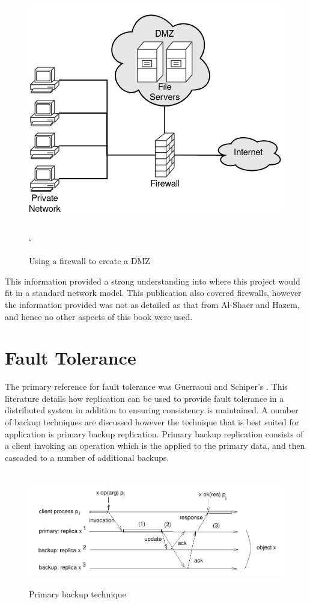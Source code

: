 \documentclass[a4paper, 11pt]{report}
\begin{document}
\begin{figure}[H]
\centering
\includegraphics[height=10cm,keepaspectratio]{DMZ}
\caption{Using a firewall to create a \acrshort{DMZ}} `
\label{fig:dmz}
\end{figure}

This information provided a strong understanding into where this project would fit in a standard network model. This publication also covered firewalls, however the information provided was not as detailed as that from Al-Shaer and Hazem, and hence no other aspects of this book were used.

\section{Fault Tolerance}
The primary reference for fault tolerance was Guerraoui and Schiper's \cite{faulttol}. This literature details how replication can be used to provide fault tolerance in a distributed system in addition to ensuring consistency is maintained.  A number of backup techniques are discussed however the technique that is best suited for application is primary backup replication. Primary backup replication consists of a client invoking an operation which is the applied to the primary data, and then cascaded to a number of additional backups.

\begin{figure}[H]
\centering
\includegraphics[height=5cm,keepaspectratio]{primback}
\caption{Primary backup technique \cite{faulttol}} 
\label{fig:backup}
\end{figure}
\end{document}
